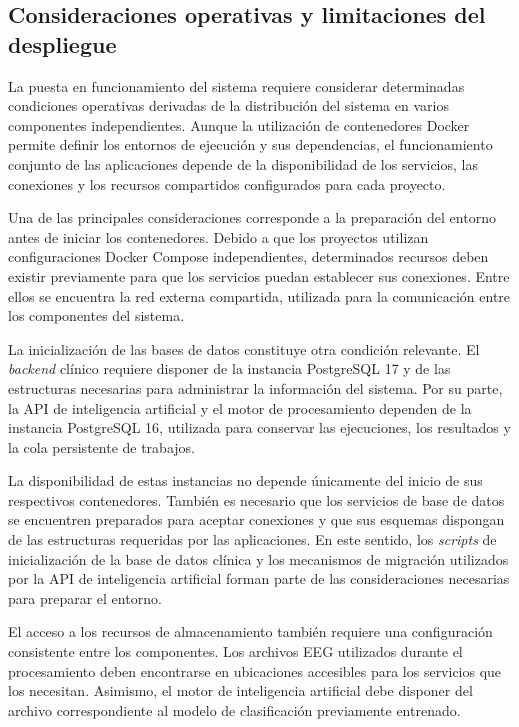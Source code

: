 \subsection[Consideraciones operativas y limitaciones del despliegue]{Consideraciones operativas y limitaciones del \\despliegue}

La puesta en funcionamiento del sistema requiere considerar
determinadas condiciones operativas derivadas de la
distribución del sistema en varios componentes independientes.
Aunque la utilización de contenedores Docker permite definir
los entornos de ejecución y sus dependencias, el funcionamiento
conjunto de las aplicaciones depende de la disponibilidad
de los servicios, las conexiones y los recursos compartidos
configurados para cada proyecto.

Una de las principales consideraciones corresponde a la
preparación del entorno antes de iniciar los contenedores.
Debido a que los proyectos utilizan configuraciones Docker
Compose independientes, determinados recursos deben existir
previamente para que los servicios puedan establecer sus
conexiones. Entre ellos se encuentra la red externa compartida, utilizada para la comunicación entre
los componentes del sistema.

La inicialización de las bases de datos constituye otra
condición relevante. El \textit{backend} clínico requiere disponer
de la instancia PostgreSQL 17 y de las estructuras necesarias
para administrar la información del sistema. Por su parte,
la API de inteligencia artificial y el motor de procesamiento
dependen de la instancia PostgreSQL 16, utilizada para
conservar las ejecuciones, los resultados y la cola
persistente de trabajos.

La disponibilidad de estas instancias no depende únicamente
del inicio de sus respectivos contenedores. También es
necesario que los servicios de base de datos se encuentren
preparados para aceptar conexiones y que sus esquemas
dispongan de las estructuras requeridas por las aplicaciones.
En este sentido, los \textit{scripts} de inicialización de la base
de datos clínica y los mecanismos de migración utilizados
por la API de inteligencia artificial forman parte de las
consideraciones necesarias para preparar el entorno.

El acceso a los recursos de almacenamiento también requiere
una configuración consistente entre los componentes. Los
archivos EEG utilizados durante el procesamiento deben
encontrarse en ubicaciones accesibles para los servicios
que los necesitan. Asimismo, el motor de inteligencia
artificial debe disponer del archivo correspondiente al
modelo de clasificación previamente entrenado.

